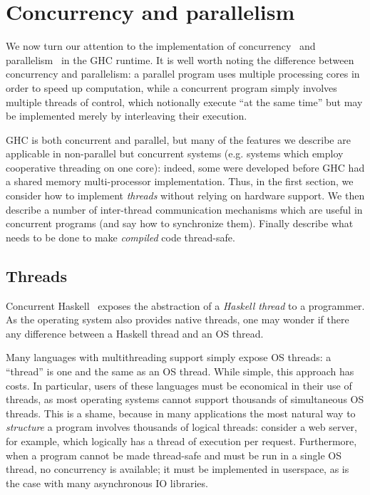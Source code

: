 \section{Concurrency and parallelism}

We now turn our attention to the implementation of
concurrency~\cite{PeytonJones:1996:CH:237721.237794} and
parallelism~\cite{Harris:2005:HSM:1088348.1088354} in the GHC runtime.
It is well worth noting the difference between concurrency and
parallelism: a parallel program uses multiple processing cores in order
to speed up computation, while a concurrent program simply involves
multiple threads of control, which notionally execute ``at the same
time'' but may be implemented merely by interleaving their execution.

GHC is both concurrent and parallel, but many of the features we
describe are applicable in non-parallel but concurrent systems (e.g.
systems which employ cooperative threading on one core): indeed, some
were developed before GHC had a shared memory multi-processor
implementation.  Thus, in the first section, we consider how to
implement \emph{threads} without relying on hardware support.  We then
describe a number of inter-thread communication mechanisms which are
useful in concurrent programs (and say how to synchronize them). Finally
describe what needs to be done to make \emph{compiled} code thread-safe.

\subsection{Threads}

Concurrent Haskell~\cite{PeytonJones:1996:CH:237721.237794} exposes the
abstraction of a \emph{Haskell thread} to a programmer. As the
operating system also provides native threads, one may wonder if there
any difference between a Haskell thread and an OS thread.

Many languages with multithreading support simply expose OS threads: a
``thread'' is one and the same as an OS thread.  While simple, this
approach has costs.  In particular, users of these languages must be
economical in their use of threads, as most operating systems cannot
support thousands of simultaneous OS threads.  This is a shame, because
in many applications the most natural way to \emph{structure} a program
involves thousands of logical threads: consider a web server, for
example, which logically has a thread of execution per request.
Furthermore, when a program cannot be made thread-safe and must be run
in a single OS thread, no concurrency is available; it must be
implemented in userspace, as is the case with many asynchronous IO
libraries.

